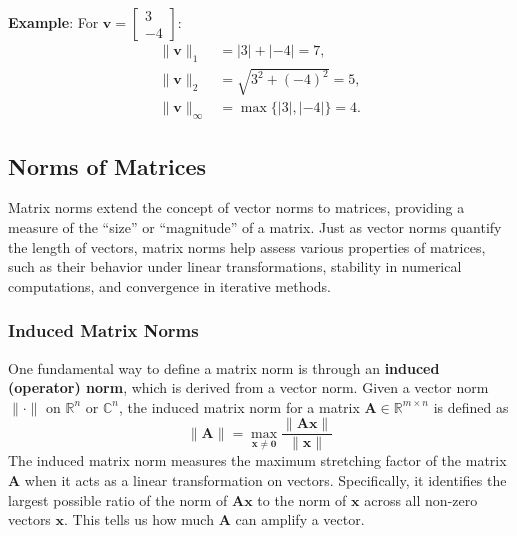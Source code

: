 \begin{exampleBox}
    \textbf{Example}: For $ \mathbf{v} = \begin{bmatrix}3 \\ -4\end{bmatrix} $:
    \begin{align*}
        \|\mathbf{v}\|_1 &= |3| + |-4| = 7, \\
        \|\mathbf{v}\|_2 &= \sqrt{3^2 + (-4)^2} = 5, \\
        \|\mathbf{v}\|_\infty &= \max\{ |3|, |-4| \} = 4.
    \end{align*}
\end{exampleBox}

\subsection{Norms of Matrices}
Matrix norms extend the concept of vector norms to matrices, providing a measure of the ``size'' or ``magnitude'' of a matrix. Just as vector norms quantify the length of vectors, matrix norms help assess various properties of matrices, such as their behavior under linear transformations, stability in numerical computations, and convergence in iterative methods.

\subsubsection{Induced Matrix Norms}
One fundamental way to define a matrix norm is through an \textbf{induced (operator) norm}, which is derived from a vector norm. Given a vector norm $ \|\cdot\| $ on $ \mathbb{R}^n $ or $ \mathbb{C}^n $, the induced matrix norm for a matrix $ \mathbf{A} \in \mathbb{R}^{m \times n} $ is defined as
\begin{equation*}
    \|\mathbf{A}\| = \max_{\mathbf{x} \neq \mathbf{0}} \frac{\|\mathbf{A}\mathbf{x}\|}{\|\mathbf{x}\|}
\end{equation*}
The induced matrix norm measures the maximum stretching factor of the matrix $ \mathbf{A} $ when it acts as a linear transformation on vectors. Specifically, it identifies the largest possible ratio of the norm of $ \mathbf{A}\mathbf{x} $ to the norm of $ \mathbf{x} $ across all non-zero vectors $ \mathbf{x} $. This tells us how much $ \mathbf{A} $ can amplify a vector.

